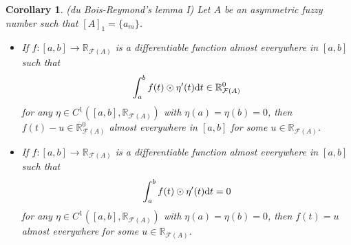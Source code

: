 \documentclass[12pt,a4paper]{article}
\newcommand{\RFA}{\mathbb{R}_{\mathcal{F}(A)}}
\newtheorem{corollary}{Corollary}
\begin{document}
\begin{corollary}(du Bois-Reymond's lemma I) \label{cor:fundamental2}
Let $A$ be an asymmetric fuzzy number such that $[A]_1 = \{a_m\}$. 
\begin{itemize}
\item[(i)] If $f:[a,b]\longrightarrow\RFA$ is a differentiable function almost everywhere in $[a,b]$  such that  
\begin{equation}\label{eq:fundamental2a}
\int_{a}^{b} f(t)\odot\eta'(t)\textnormal{d}t \in \RFA^0	
\end{equation}
for any $\eta \in C^1\left([a,b],\RFA\right)$ with $\eta(a)=\eta(b)=0$, then 
$f(t) - u \in \RFA^0$ almost everywhere in $[a,b]$ for some $u \in \RFA$.

\item[(ii)] If $f:[a,b]\longrightarrow\RFA$ is a differentiable function almost everywhere in $[a,b]$  such that  
\begin{equation}\label{eq:fundamental2b}
\int_{a}^{b} f(t)\odot\eta'(t)\textnormal{d}t = 0	
\end{equation}
for any $\eta \in C^1\left([a,b],\RFA\right)$ with $\eta(a)=\eta(b)=0$, then 
$f(t) = u$ almost everywhere for some $u \in \RFA$.

\end{itemize}
\end{corollary}
\end{document}
